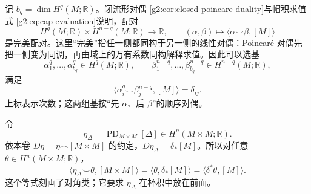 记 \(b_q=\dim H^q(M;\mathbb R)\)。闭流形对偶 \cref{g2:cor:closed-poincare-duality}与帽积求值式 \eqref{g2:eq:cap-evaluation}说明，配对
\[
	H^q(M;\mathbb R)\times H^{n-q}(M;\mathbb R)
	\longrightarrow\mathbb R,
	\qquad (\alpha,\beta)\longmapsto\langle\alpha\smile\beta,[M]\rangle
\]
是完美配对。这里“完美”指任一侧都同构于另一侧的线性对偶：Poincaré 对偶先把一侧变为同调，再由域上的万有系数同构解释求值。因此可以选基
\[
	\alpha_1^q,\ldots,\alpha_{b_q}^q\in H^q(M;\mathbb R),
	\qquad \beta_1^{n-q},\ldots,\beta_{b_q}^{n-q}\in H^{n-q}(M;\mathbb R),
\]
满足
\begin{equation}\label{g2:eq:lefschetz-dual-bases}
	\langle\alpha_i^q\smile\beta_j^{n-q},[M]\rangle=\delta_{ij}.
\end{equation}
上标表示次数；这两组基按“先 \(\alpha\)、后 \(\beta\)”的顺序对偶。

\ProseParagraphBreak

令
\[
	\eta_\Delta=\operatorname{PD}_{M\times M}[\Delta]\in H^n(M\times M;\mathbb R).
\]
依本卷 \(D\eta=\eta\frown[M\times M]\) 的约定，\(D\eta_\Delta=\delta_*[M]\)。所以对任意 \(\theta\in H^n(M\times M;\mathbb R)\)，
\begin{equation}\label{g2:eq:diagonal-class-characterization}
	\langle\eta_\Delta\smile\theta,[M\times M]\rangle
	=\langle\theta,\delta_*[M]\rangle
	=\langle\delta^*\theta,[M]\rangle.
\end{equation}
这个等式刻画了对角类；它要求 \(\eta_\Delta\) 在杯积中放在前面。

